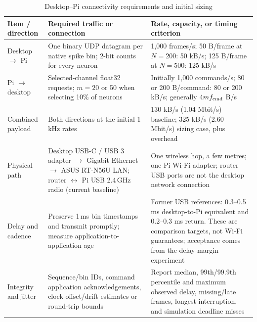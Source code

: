 \begin{table}[H]
\centering\small
\caption{Desktop--Pi connectivity requirements and initial sizing}
\label{tab:desktop-pi}
\begin{tabular}{@{}L{3.0cm}L{6.2cm}L{7.3cm}@{}}
\toprule
\textbf{Item / direction} & \textbf{Required traffic or connection} & \textbf{Rate, capacity, or timing criterion} \\
\midrule
Desktop $\to$ Pi & One binary UDP datagram per native spike bin; 2-bit counts for every neuron & 1,000 frames/s; 50 B/frame at $N=200$: 50 kB/s; 125 B/frame at $N=500$: 125 kB/s \\
Pi $\to$ desktop & Selected-channel float32 requests; $m=20$ or 50 when selecting 10\% of neurons & Initially 1,000 commands/s; 80 or 200 B/command: 80 or 200 kB/s; generally $4m f_{\rm cmd}$ B/s \\
Combined payload & Both directions at the initial 1\,kHz rates & 130 kB/s (1.04 Mbit/s) baseline; 325 kB/s (2.60 Mbit/s) sizing case, plus overhead \\
Physical path & Desktop USB-C / USB 3 adapter $\to$ Gigabit Ethernet $\to$ ASUS RT-N56U LAN; router $\leftrightarrow$ Pi USB 2.4\,GHz radio (current baseline) & One wireless hop, a few metres; one Pi Wi-Fi adapter; router USB ports are not the desktop network connection \\
Delay and cadence & Preserve 1\,ms bin timestamps and transmit promptly; measure application-to-application age & Former USB references: 0.3--0.5 ms desktop-to-Pi equivalent and 0.2--0.3 ms return. These are comparison targets, not Wi-Fi guarantees; acceptance comes from the delay-margin experiment \\
Integrity and jitter & Sequence/bin IDs, command application acknowledgements, clock-offset/drift estimates or round-trip bounds & Report median, 99th/99.9th percentile and maximum observed delay, missing/late frames, longest interruption, and simulation deadline misses \\
\bottomrule
\end{tabular}
\end{table}

